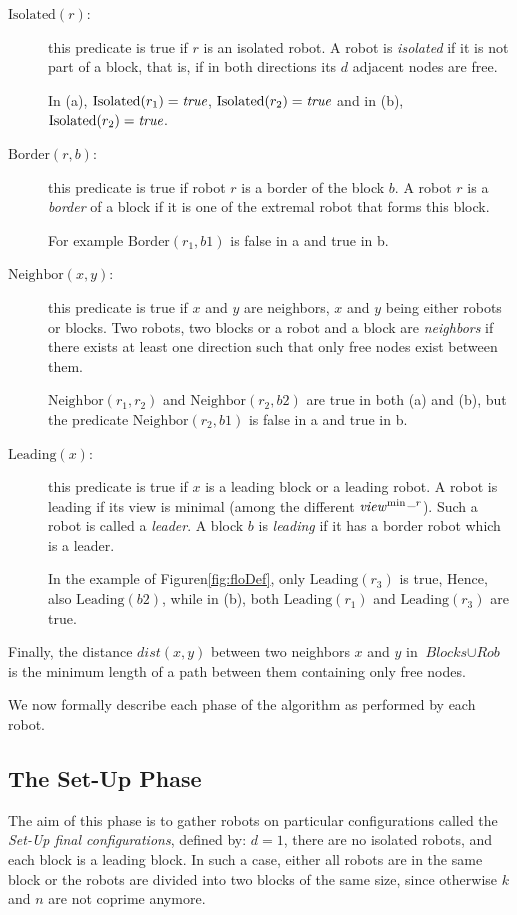 \begin{description}%
\item [$\textrm{Isolated}(r)$: ] this predicate is true if $r$ is an
  isolated robot. A robot is \emph{isolated} if it is not part of
  a block, that is, if in both directions its $d$ adjacent nodes are
  free.

  In (a), $\textrm{Isolated}(r_1) = \textit{true}$, 
  $\textrm{Isolated}(r_2)=\textit{true}$ and in (b), 
  $\textrm{Isolated}(r_2)=\textit{true}$.

\item [$\textrm{Border}(r, b)$: ] this predicate is true if robot $r$ is
  a border of the block $b$. A robot $r$ is a \emph{border} of a block
  if it is one of the extremal robot that forms this block.
  
  For example $\textrm{Border}(r_1, b1)$ is false in a and true in b.
\item [$\textrm{Neighbor}(x, y)$: ] this predicate is true if $x$ and
  $y$ are neighbors, $x$ and $y$ being either robots or blocks. Two
  robots, two blocks or a robot and a block are \emph{neighbors} if
  there exists at least one direction such that only free nodes exist
  between them.
  
  $\textrm{Neighbor}(r_1, r_2)$ and $\textrm{Neighbor}(r_2, b2)$ are
  true in both (a) and (b), but the predicate $\textrm{Neighbor}(r_2, b1)$ is false
  in a and true in b.
\item [$\textrm{Leading}(x)$: ] this predicate is true if $x$ is a
  leading block or a leading robot. A robot is leading if its view is
  minimal (among the different $\mathit{view}^{\min\_r}$). Such a robot is
  called a \emph{leader}. A block $b$ is \emph{leading} if it has a
  border robot which is a leader.

  In the example of Figuren\ref{fig:floDef}, only $\textrm{Leading}(r_3)$ is true, Hence, also
  $\textrm{Leading}(b2)$, while in (b), both $\textrm{Leading}(r_1)$
  and $\textrm{Leading}(r_3)$ are true.
 \end{description}
Finally, the distance $\textit{dist}(x, y)$ between two neighbors $x$
 and $y$ in $\textit{Blocks} \cup \textit{Rob}$ is the minimum length
 of a path between them containing only free nodes.

 We now formally describe each phase of the algorithm as
 performed by each robot.
 
 \subsection{The Set-Up Phase}\label{setup} 
 The aim of this phase is to gather robots on particular
 configurations called the \emph{Set-Up final configurations}, defined
 by: $d=1$, there are no isolated robots, and each block is a leading
 block. In such a case, either all robots are in
 the same block or the robots are divided into two blocks of the same
 size, since otherwise $k$ and $n$ are not coprime anymore.

